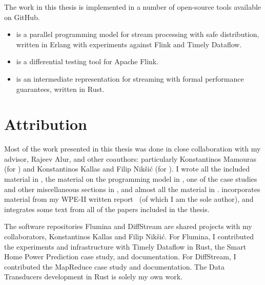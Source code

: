 The work in this thesis is implemented in a number of open-source tools available on GitHub.
\begin{samepage}
\begin{itemize}
\item {} is a parallel programming model for stream processing with safe distribution, written in Erlang with experiments against Flink and Timely Dataflow.
\item {} is a differential testing tool for Apache Flink.
\item {} is an intermediate representation for streaming with formal performance guarantees, written in Rust.
\end{itemize}
\end{samepage}

\section{Attribution}

Most of the work presented in this thesis was done in close collaboration with my advisor, Rajeev Alur, and other coauthors:
particularly Konstantinos Mamouras (for ) and Konstantinos Kallas and Filip Nikšić (for ).
I wrote all the included material in , the material on the programming model in , one of the case studies and other miscellaneous sections in , and almost all the material in .
 incorporates material from my WPE-II written report~ (of which I am the sole author), and  integrates some text from all of the papers included in the thesis.

The software repositories Flumina and DiffStream are shared projects with my collaborators, Konstantinos Kallas and Filip Nikšić.
For Flumina, I contributed the experiments and infrastructure with Timely Dataflow in Rust, the Smart Home Power Prediction case study, and documentation.
For DiffStream, I contributed the MapReduce case study and documentation.
The Data Transducers development in Rust is solely my own work.
